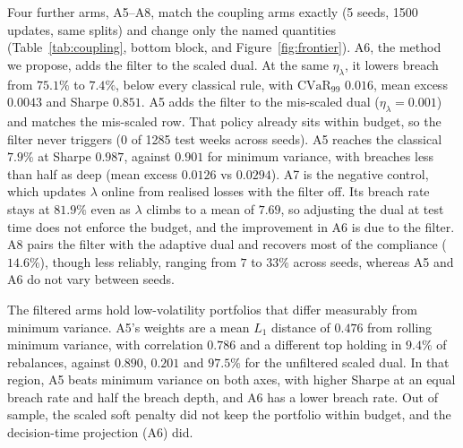 \documentclass[sigconf]{acmart}
\begin{document}
Four further arms, A5--A8, match the coupling arms exactly (5 seeds, 1500 updates, same splits) and change
only the named quantities (Table~\ref{tab:coupling}, bottom block, and Figure~\ref{fig:frontier}).
A6, the method we propose, adds the filter to the scaled dual. At the same $\eta_\lambda$, it
lowers breach from $75.1\%$ to $7.4\%$, below every classical rule, with $\mathrm{CVaR}_{99}$
$0.016$, mean excess $0.0043$ and Sharpe $0.851$. A5 adds the filter to the mis-scaled dual
($\eta_\lambda=0.001$) and matches the mis-scaled row. That policy already sits within budget,
so the filter never triggers (0 of 1285 test weeks across seeds). A5 reaches the classical
$7.9\%$ at Sharpe $0.987$, against $0.901$ for minimum variance, with breaches less than half as
deep (mean excess $0.0126$ vs $0.0294$). A7 is the negative control, which updates $\lambda$ online from realised losses with the filter off. Its breach rate stays at $81.9\%$ even as $\lambda$
climbs to a mean of $7.69$, so adjusting the dual at test time does not enforce the budget, and
the improvement in A6 is due to the filter. A8 pairs the filter with the adaptive dual and
recovers most of the compliance ($14.6\%$), though less reliably, ranging from $7$ to $33\%$ across seeds,
whereas A5 and A6 do not vary between seeds.

The filtered arms hold low-volatility portfolios that differ measurably from minimum variance. A5's weights are a mean $L_1$ distance of $0.476$ from rolling minimum variance, with
correlation $0.786$ and a different top holding in $9.4\%$ of rebalances, against $0.890$,
$0.201$ and $97.5\%$ for the unfiltered scaled dual. In that region, A5 beats minimum variance on
both axes, with higher Sharpe at an equal breach rate and half the breach depth, and A6 has a
lower breach rate. Out of sample, the scaled soft penalty did not keep the portfolio within
budget, and the decision-time projection (A6) did.
\end{document}
